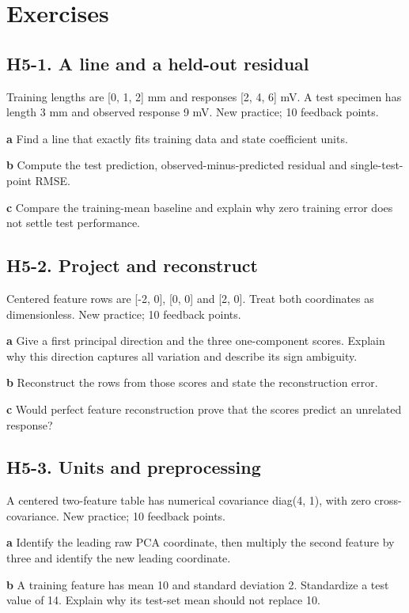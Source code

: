 \documentclass[11pt,letterpaper]{article}
\theoremstyle{definition}\newtheorem{definition}{Definition}\newtheorem{example}{Example}
\numberwithin{equation}{section}
\begin{document}
\section*{Exercises}
\par\noindent\begin{minipage}{\linewidth}
\subsection*{H5-1. A line and a held-out residual}
Training lengths are [0, 1, 2] mm and responses [2, 4, 6] mV. A test specimen has length 3 mm and observed response 9 mV. New practice; 10 feedback points.

\textbf{a} Find a line that exactly fits training data and state coefficient units.

\end{minipage}\par\medskip
\textbf{b} Compute the test prediction, observed-minus-predicted residual and single-test-point RMSE.

\textbf{c} Compare the training-mean baseline and explain why zero training error does not settle test performance.

\par\noindent\begin{minipage}{\linewidth}
\subsection*{H5-2. Project and reconstruct}
Centered feature rows are [-2, 0], [0, 0] and [2, 0]. Treat both coordinates as dimensionless. New practice; 10 feedback points.

\textbf{a} Give a first principal direction and the three one-component scores. Explain why this direction captures all variation and describe its sign ambiguity.

\end{minipage}\par\medskip
\textbf{b} Reconstruct the rows from those scores and state the reconstruction error.

\textbf{c} Would perfect feature reconstruction prove that the scores predict an unrelated response?

\par\noindent\begin{minipage}{\linewidth}
\subsection*{H5-3. Units and preprocessing}
A centered two-feature table has numerical covariance diag(4, 1), with zero cross-covariance. New practice; 10 feedback points.

\textbf{a} Identify the leading raw PCA coordinate, then multiply the second feature by three and identify the new leading coordinate.

\end{minipage}\par\medskip
\textbf{b} A training feature has mean 10 and standard deviation 2. Standardize a test value of 14. Explain why its test-set mean should not replace 10.
\end{document}
